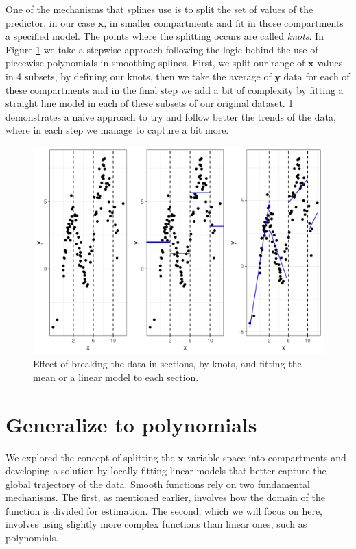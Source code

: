 \documentclass[
]{book}
\begin{document}
One of the mechanisms that splines use is to split the set of values of the predictor, in our case \(\mathbf{x}\), in smaller compartments and fit in those compartments a specified model. The points where the splitting occurs are called \emph{knots}. In Figure \ref{fig:knots} we take a stepwise approach following the logic behind the use of piecewise polynomials in smoothing splines. First, we split our range of \(\mathbf{x}\) values in 4 subsets, by defining our knots, then we take the average of \(\mathbf{y}\) data for each of these compartments and in the final step we add a bit of complexity by fitting a straight line model in each of these subsets of our original dataset. \ref{fig:knots} demonstrates a naive approach to try and follow better the trends of the data, where in each step we manage to capture a bit more.

\begin{figure}
\centering
\includegraphics{_bookdown_files/_main_files/figure-html/knots-1.png}
\caption{\label{fig:knots}Effect of breaking the data in sections, by knots, and fitting the mean or a linear model to each section.}
\end{figure}

\hypertarget{generalize-to-polynomials}{%
\section{Generalize to polynomials}\label{generalize-to-polynomials}}

We explored the concept of splitting the \(\mathbf{x}\) variable space into compartments and developing a solution by locally fitting linear models that better capture the global trajectory of the data. Smooth functions rely on two fundamental mechanisms. The first, as mentioned earlier, involves how the domain of the function is divided for estimation. The second, which we will focus on here, involves using slightly more complex functions than linear ones, such as polynomials.
\end{document}
